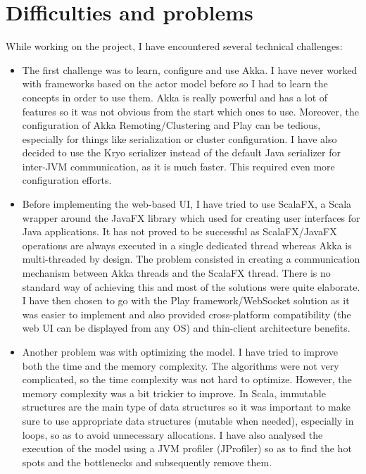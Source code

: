 \documentclass[titlepage]{article}
\begin{document}
\section{Difficulties and problems}
While working on the project, I have encountered several technical challenges:
\begin{itemize}
\item The first challenge was to learn, configure and use Akka. I have never worked with frameworks based on the actor model before so I had to learn the concepts in order to use them. Akka is really powerful and has a lot of features so it was not obvious from the start which ones to use. Moreover, the configuration of Akka Remoting/Clustering and Play can be tedious, especially for things like serialization or cluster configuration. I have also decided to use the Kryo serializer instead of the default Java serializer for inter-JVM communication, as it is much faster. This required even more configuration efforts.
\item Before implementing the web-based UI, I have tried to use ScalaFX, a Scala wrapper around the JavaFX library which used for creating user interfaces for Java applications. It has not proved to be successful as ScalaFX/JavaFX operations are always executed in a single dedicated thread whereas Akka is multi-threaded by design. The problem consisted in creating a communication mechanism between Akka threads and the ScalaFX thread. There is no standard way of achieving this and most of the solutions were quite elaborate. I have then chosen to go with the Play framework/WebSocket solution as it was easier to implement and also provided cross-platform compatibility (the web UI can be displayed from any OS) and thin-client architecture benefits.
\item Another problem was with optimizing the model. I have tried to improve both the time and the memory complexity. The algorithms were not very complicated, so the time complexity was not hard to optimize. However, the memory complexity was a bit trickier to improve. In Scala, immutable structures are the main type of data structures so it was important to make sure to use appropriate data structures (mutable when needed), especially in loops, so as to avoid unnecessary allocations. I have also analysed the execution of the model using a JVM profiler (JProfiler) so as to find the hot spots and the bottlenecks and subsequently remove them.
\end{itemize}
\end{document}

